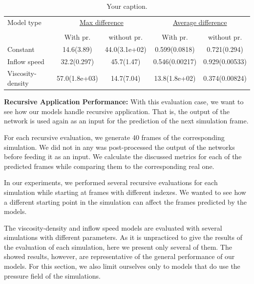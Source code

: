 \documentclass{llncs}
\begin{document}
\begin{table}
  \begin{center}
    \begin{tabular}{lcc|cc}
      \hline
      \hline
      Model type & \multicolumn{2}{c|}{\underline{Max difference}}  &  \multicolumn{2}{c}{\underline{Average difference}}\\
      \multicolumn{3}{c|}{}&&\\
                 & With pr. & without pr.  &  With pr.& without pr.\\
      \hline
      Constant          &  14.6(3.89)&44.0(3.1e+02)&0.599(0.0818)&0.721(0.294)  \\

      Inflow speed      &  32.2(0.297)&45.7(1.47)&0.546(0.00217)&0.929(0.00533) \\

      Viscosity-density &  57.0(1.8e+03)&14.7(7.04)&13.8(1.8e+02)&0.374(0.00824) \\
    \end{tabular}
  \end{center}
  \caption{\label{tab:table-name} Your caption.}
\end{table}

\noindent\textbf{Recursive Application Performance:}
With this evaluation case, we want to see how our models handle recursive application. That is, the output of the network is used again as an input for the prediction of the next simulation frame.

For each recursive evaluation, we generate 40 frames of the corresponding simulation. We did not in any was post-processed the output of the networks before feeding it as an input. We calculate the discussed metrics for each of the predicted frames while comparing them to the corresponding real one.

In our experiments, we performed several recursive evaluations for each simulation while starting at frames with different indexes. We wanted to see how a different starting point in the simulation can affect the frames predicted by the models.

The viscosity-density and inflow speed models are evaluated with several simulations with different parameters. As it is unpracticed to give the results of the evaluation of each simulation, here we present only several of them. The showed results, however, are representative of the general performance of our models. For this section, we also limit ourselves only to models that do use the pressure field of the simulations.
\end{document}
